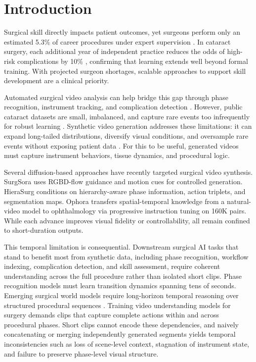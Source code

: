 \documentclass[runningheads]{llncs}
\begin{document}
\section{Introduction}
Surgical skill directly impacts patient outcomes, yet surgeons perform only an estimated 5.3\% of career procedures under expert supervision \cite{valentine2011general}. In cataract surgery, each additional year of independent practice reduces the odds of high-risk complications by 10\% \cite{awshah2024current}, confirming that learning extends well beyond formal training. With projected surgeon shortages, scalable approaches to support skill development are a clinical priority.

Automated surgical video analysis can help bridge this gap through phase recognition, instrument tracking, and complication detection \cite{shah2025step,padoy2019machine}. However, public cataract datasets are small, imbalanced, and capture rare events too infrequently for robust learning \cite{lecuyer2020assisted,padoy2019machine}. Synthetic video generation addresses these limitations: it can expand long-tailed distributions, diversify visual conditions, and oversample rare events without exposing patient data \cite{ozawa2021synthetic,su2021local}. For this to be useful, generated videos must capture instrument behaviors, tissue dynamics, and procedural logic.

Several diffusion-based approaches have recently targeted surgical video synthesis. SurgSora \cite{chen2024surgsoradecoupledrgbdflow} uses RGBD-flow guidance and motion cues for controlled generation. HieraSurg \cite{biagini2025hierasurghierarchyawarediffusion} conditions on hierarchy-aware phase information, action triplets, and segmentation maps. Ophora \cite{LiWei_Ophora_MICCAI2025} transfers spatial-temporal knowledge from a natural-video model to ophthalmology via progressive instruction tuning on 160K pairs. While each advance improves visual fidelity or controllability, all remain confined to short-duration outputs.

This temporal limitation is consequential. Downstream surgical AI tasks that stand to benefit most from synthetic data, including phase recognition, workflow indexing, complication detection, and skill assessment, require coherent understanding across the full procedure rather than isolated short clips. Phase recognition models must learn transition dynamics spanning tens of seconds. Emerging surgical world models require long-horizon temporal reasoning over structured procedural sequences \cite{xu2025surgicalactionplanninglarge}. Training video understanding models for surgery demands clips that capture complete actions within and across procedural phases. Short clips cannot encode these dependencies, and naively concatenating or merging independently generated segments yields temporal inconsistencies such as loss of scene-level context, stagnation of instrument state, and failure to preserve phase-level visual structure.
\end{document}

